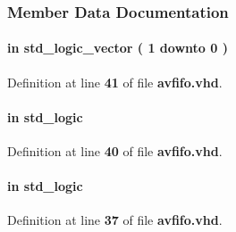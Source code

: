 \subsubsection{Member Data Documentation}
\paragraph[{address}]{ {\bfseries \textcolor{keywordflow}{in}\textcolor{vhdlchar}{ }} {\bfseries \textcolor{comment}{std\+\_\+logic\+\_\+vector}\textcolor{vhdlchar}{ }\textcolor{vhdlchar}{(}\textcolor{vhdlchar}{ }\textcolor{vhdlchar}{ } \textcolor{vhdldigit}{1} \textcolor{vhdlchar}{ }\textcolor{keywordflow}{downto}\textcolor{vhdlchar}{ }\textcolor{vhdlchar}{ } \textcolor{vhdldigit}{0} \textcolor{vhdlchar}{ }\textcolor{vhdlchar}{)}\textcolor{vhdlchar}{ }} \hspace{0.3cm}{\ttfamily [Port]}}\label{classavfifo_a7e5ab875ee7bfbff113034cc739513e6}


Definition at line {\bf 41} of file {\bf avfifo.\+vhd}.

\paragraph[{chipselect}]{ {\bfseries \textcolor{keywordflow}{in}\textcolor{vhdlchar}{ }} {\bfseries \textcolor{comment}{std\+\_\+logic}\textcolor{vhdlchar}{ }} \hspace{0.3cm}{\ttfamily [Port]}}\label{classavfifo_ac19eff6846e514e24e6795732cf2f8a3}


Definition at line {\bf 40} of file {\bf avfifo.\+vhd}.

\paragraph[{clk}]{ {\bfseries \textcolor{keywordflow}{in}\textcolor{vhdlchar}{ }} {\bfseries \textcolor{comment}{std\+\_\+logic}\textcolor{vhdlchar}{ }} \hspace{0.3cm}{\ttfamily [Port]}}\label{classavfifo_a4a4609c199d30b3adebbeb3a01276ec5}


Definition at line {\bf 37} of file {\bf avfifo.\+vhd}.

